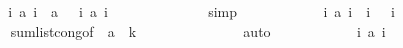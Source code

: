 \begin{isabellebody}
\ \ \ \ \ \ \ \ \ \ \isamarkupfalse%
\ \isamarkupfalse%
\ {\isachardoublequoteopen}{\isacharparenleft}{\isasymSum}i{\isasymleftarrow}{\isacharbrackleft}{}{\isachardot}{\isachardot}{\isacharless}{}{}{}{}{\isacharbrackright}{\isachardot}\ {\isacharquery}a\ i{\isacharparenright}\ {\isacharequal}\ {\isacharquery}a\ {}\ {\isacharplus}\ {\isacharparenleft}{\isasymSum}i{\isasymleftarrow}{\isacharbrackleft}{}{\isachardot}{\isachardot}{\isacharless}{}{}{}{}{\isacharbrackright}{\isachardot}\ {\isacharquery}a\ i{\isacharparenright}{\isachardoublequoteclose}\isanewline
\ \ \ \ \ \ \ \ \ \ \ \ \isamarkupfalse%
\ simp\isanewline
\ \ \ \ \ \ \ \ \ \ \isamarkupfalse%
\ {\isachardoublequoteopen}{\isacharparenleft}{\isasymSum}i{\isasymleftarrow}{\isacharbrackleft}{}{\isachardot}{\isachardot}{\isacharless}{}{}{}{}{\isacharbrackright}{\isachardot}\ {\isacharquery}a\ i{\isacharparenright}\ {\isacharequal}\ {\isacharparenleft}{\isasymSum}i{\isasymleftarrow}{\isacharbrackleft}{}{\isachardot}{\isachardot}{\isacharless}{}{\isacharbrackright}{\isachardot}\ {}{\isacharparenright}\ {\isacharplus}\ {\isacharparenleft}{\isasymSum}i{\isasymleftarrow}{\isacharbrackleft}{}{\isachardot}{\isachardot}{\isacharless}{}{}{}{}{\isacharbrackright}{\isachardot}\ {}{\isacharparenright}{\isachardoublequoteclose}\isanewline
\ \ \ \ \ \ \ \ \ \ \ \ \isamarkupfalse%
\ sum{\isacharunderscore}list{\isacharunderscore}cong{\isacharbrackleft}of\ {\isachardoublequoteopen}{\isacharbrackleft}{}{\isachardot}{\isachardot}{\isacharless}{}{}{}{}{\isacharbrackright}{\isachardoublequoteclose}\ {\isacharquery}a\ {\isachardoublequoteopen}{\isasymlambda}\ k{\isachardot}\ {}{\isachardoublequoteclose}{\isacharbrackright}\isanewline
\ \ \ \ \ \ \ \ \ \ \ \ \isamarkupfalse%
\ auto\isanewline
\ \ \ \ \ \ \ \ \ \ \isamarkupfalse%
\ {\isachardoublequoteopen}{\isacharparenleft}{\isasymSum}i{\isasymleftarrow}{\isacharbrackleft}{}{\isachardot}{\isachardot}{\isacharless}{}{}{}{}{\isacharbrackright}{\isachardot}\ {\isacharquery}a\ i{\isacharparenright}\ {\isacharequal}\ {}{}{}{}{\isachardoublequoteclose}\isanewline

\end{isabellebody}
